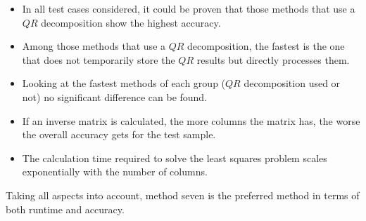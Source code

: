 \begin{itemize}
	\item In all test cases considered, it could be proven that those methods that use a $QR$ decomposition show the highest accuracy.
	\item Among those methods that use a $QR$ decomposition, the fastest is the one that does not temporarily store the $QR$ results but directly processes them. 
	\item Looking at the fastest methods of each group ($QR$ decomposition used or not) no significant difference can be found.
	\item If an inverse matrix is calculated, the more columns the matrix has, the worse the overall accuracy gets for the test sample.
	\item The calculation time required to solve the least squares problem scales exponentially with the number of columns.
\end{itemize} 

Taking all aspects into account, method seven is the preferred method in terms of both runtime and accuracy. 
